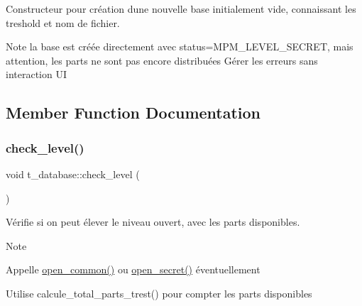 Constructeur pour création d\textquotesingle{}une nouvelle base initialement vide, connaissant les treshold et nom de fichier. 

\begin{DoxyNote}{Note}
la base est créée directement avec status=M\+P\+M\+\_\+\+L\+E\+V\+E\+L\+\_\+\+S\+E\+C\+R\+ET, mais attention, les parts ne sont pas encore distribuées  Gérer les erreurs sans interaction UI 
\end{DoxyNote}


\subsection{Member Function Documentation}
\mbox{\label{classt__database_aff1abd122b7ea2dedf36eff44d75f0ef}} 
\subsubsection{\texorpdfstring{check\+\_\+level()}{check\_level()}}
{\footnotesize\ttfamily void t\+\_\+database\+::check\+\_\+level (\begin{DoxyParamCaption}{ }\end{DoxyParamCaption})}



Vérifie si on peut élever le niveau ouvert, avec les parts disponibles. 

\begin{DoxyNote}{Note}

\begin{DoxyItemize}
\item Appelle \hyperlink{classt__database_a22b32d446f8e07101c81354517502467}{open\+\_\+common()} ou \hyperlink{classt__database_ab0fd87c39625de20aa554a982fa00fa4}{open\+\_\+secret()} éventuellement
\item Utilise calcule\+\_\+total\+\_\+parts\+\_\+trest() pour compter les parts disponibles 
\end{DoxyItemize}
\end{DoxyNote}
\mbox{\label{classt__database_a9390c70f9abc03a7174ca19941573632}} 
